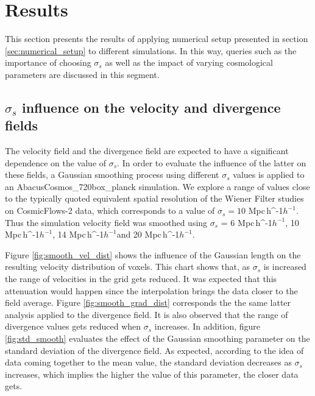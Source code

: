 \documentclass[usenatbib]{mnras}
\newcommand{\Mpch}{\,{\rm Mpc}\,\ifmmode h^{-1}\else $h^{-1}$\fi}
\begin{document}
\section{Results}
This section presents the results of applying numerical setup presented in section \ref{sec:numerical_setup} to different simulations. In this way, queries such as the importance of choosing $\sigma_s$ as well as the impact of varying cosmological parameters are discussed in this segment.

\subsection{$\sigma_s$ influence on the velocity and divergence fields}
\label{VDF effects}

The velocity field and the divergence field are expected to have a significant dependence on the value of $\sigma_s$. In order to evaluate the influence of the latter on these fields, a Gaussian smoothing process using different $\sigma_s$ values is applied to an AbacusCosmos\_720box\_planck simulation.
We explore a range of values close to the typically quoted equivalent
spatial resolution of the Wiener Filter studies on
CosmicFlows-2 data, which corresponds to a value of $\sigma_s = 10$\,\Mpch.
Thus the simulation velocity field was smoothed using $\sigma_s$ = 6\,\Mpch, 10\,\Mpch, 14\,\Mpch and 20\,\Mpch. 

Figure \ref{fig:smooth_vel_dist} shows the influence of the Gaussian length on the resulting velocity distribution of voxels. This chart shows that, as $\sigma_s$ is increased the range of velocities in the grid gets reduced. It was expected that this attenuation would happen since the interpolation brings the data closer to the field average. Figure \ref{fig:smooth_grad_dist} corresponds the the same latter analysis applied to the divergence field. It is also observed that the range of divergence values gets reduced when $\sigma_s$ increases. In addition, figure \ref{fig:std_smooth} evaluates the effect of the Gaussian smoothing parameter on the standard deviation of the divergence field. As expected, according to the idea of data coming together to the mean value, the standard deviation decreases as $\sigma_s$ increases, which implies the higher the value of this parameter, the closer data gets.
\end{document}
